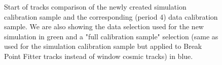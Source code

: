 \documentclass[12pt]{article}
\begin{document}
\begin{figure}[!ht]

\caption{Start of tracks comparison of the newly created simulation calibration sample and the corresponding (period 4) data calibration sample. We are also showing the data selection used for the new simulation in green and a "full calibration sample" selection (same as used for the simulation calibration sample but applied to Break Point Fitter tracks instead of window cosmic tracks) in blue.}
\label{figDataMCComparison_startXstartY}
\end{figure}
\end{document}
